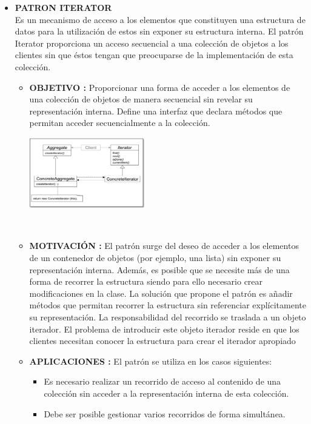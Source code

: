 \documentclass[twoside,twocolumn]{article}
\begin{document}
\begin{itemize}
    \item \textbf{PATRON ITERATOR} \\
    Es un mecanismo de acceso a los elementos que constituyen una estructura de datos para la utilización de estos sin exponer su estructura interna. 
    El patrón Iterator proporciona un acceso secuencial a una colección de objetos a los clientes sin que éstos tengan que preocuparse de la implementación de esta colección. 
    
	\begin{itemize}
		\item \textbf{OBJETIVO :}	Proporcionar una forma de acceder a los elementos de una colección de objetos de manera secuencial sin revelar su representación interna. 
        Define una interfaz que declara métodos que permitan acceder secuencialmente a la colección. 
         
        \begin{center}
            \includegraphics[width=5cm]{./img/Imagen9.png} 
        \end{center}
        \\
		\item \textbf{MOTIVACIÓN  :} El patrón surge del deseo de acceder a los elementos de un contenedor de objetos (por ejemplo, una lista) sin exponer su representación interna. Además, es posible que se necesite más de una forma de recorrer la estructura siendo para ello necesario crear modificaciones en la clase. 
        La solución que propone el patrón es añadir métodos que permitan recorrer la estructura sin referenciar explícitamente su representación. La responsabilidad del recorrido se traslada a un objeto iterador.  
        El problema de introducir este objeto iterador reside en que los clientes necesitan conocer la estructura para crear el iterador apropiado
         

		\item \textbf{APLICACIONES  :} El patrón se utiliza en los casos siguientes:  
            \begin{itemize}
            \item Es necesario realizar un recorrido de acceso al contenido de una colección sin acceder a la representación interna de esta colección. 
            \item Debe ser posible gestionar varios recorridos de forma simultánea.
            \end{itemize}   
        

\end{itemize}
\end{itemize}
\end{document}
